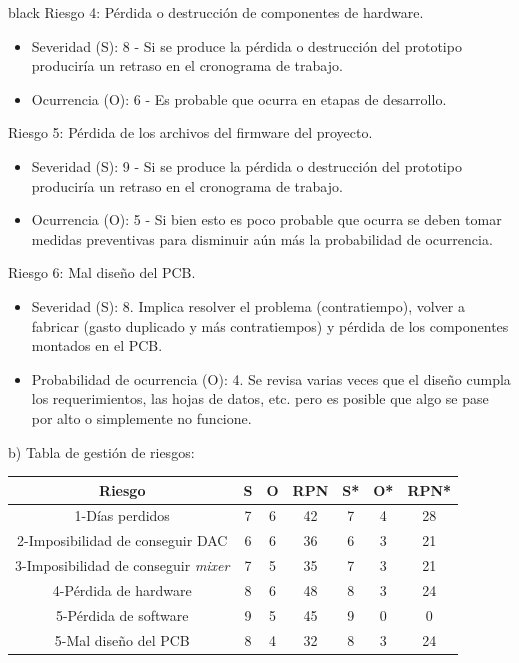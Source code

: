 \documentclass[11pt]{charter}
\begin{document}
\begin{consigna}{black}
Riesgo 4:  Pérdida o destrucción de componentes de hardware.
\begin{itemize}
\item Severidad (S): 8 - Si se produce la pérdida o destrucción del prototipo produciría un retraso en el cronograma de trabajo.
\item Ocurrencia (O): 6 - Es probable que ocurra en etapas de desarrollo.
\end{itemize}

Riesgo 5: Pérdida de los archivos del firmware del proyecto.
\begin{itemize}
\item Severidad (S): 9 - Si se produce la pérdida o destrucción del prototipo produciría un retraso en el cronograma de trabajo.
\item Ocurrencia (O): 5 - Si bien esto es poco probable que ocurra se deben tomar medidas preventivas para disminuir aún más la probabilidad de ocurrencia.
\end{itemize}

Riesgo 6: Mal diseño del PCB.
\begin{itemize}
\item Severidad (S): 8. Implica resolver el problema (contratiempo), volver a fabricar (gasto duplicado y más contratiempos) y pérdida de los componentes montados en el PCB.
\item Probabilidad de ocurrencia (O): 4. Se revisa varias veces que el diseño cumpla los
requerimientos, las hojas de datos, etc. pero es posible que algo se pase por alto o
simplemente no funcione.
\end{itemize} 
b) Tabla de gestión de riesgos:

\begin{table}[H]
\centering
\begin{tabular}{@{}|c|c|c|c|c|c|c|@{}}
\hline
\rowcolor[HTML]{C0C0C0} 
Riesgo & S  & O  & RPN & S* & O* & RPN* \\ \hline
1-Días perdidos      & 7  & 6  & 42  & 7  & 4  &  28  \\ \hline
2-Imposibilidad de conseguir DAC & 6  & 6  & 36  & 6  & 3  &  21  \\ \hline
3-Imposibilidad de conseguir \textit{mixer}      & 7  & 5  & 35  & 7  & 3  &  21  \\ \hline
4-Pérdida de hardware & 8  & 6  & 48  & 8  & 3  &  24  \\ \hline
5-Pérdida de software      & 9  & 5  & 45  & 9  & 0  &  0  \\ \hline
5-Mal diseño del PCB      & 8  & 4  & 32  & 8  & 3  &  24  \\ \hline
\end{tabular}%
\end{table}


\end{consigna}
\end{document}
